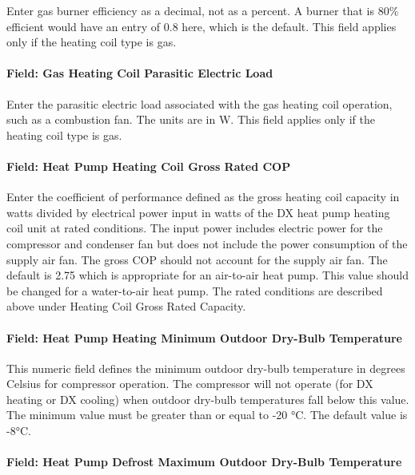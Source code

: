 Enter gas burner efficiency as a decimal, not as a percent. A burner that is 80\% efficient would have an entry of 0.8 here, which is the default. This field applies only if the heating coil type is gas.

\paragraph{Field: Gas Heating Coil Parasitic Electric Load}\label{field-gas-heating-coil-parasitic-electric-load-2}

Enter the parasitic electric load associated with the gas heating coil operation, such as a combustion fan. The units are in W. This field applies only if the heating coil type is gas.

\paragraph{Field: Heat Pump Heating Coil Gross Rated COP}\label{field-heat-pump-heating-coil-gross-rated-cop-3}

Enter the coefficient of performance defined as the gross heating coil capacity in watts divided by electrical power input in watts of the DX heat pump heating coil unit at rated conditions. The input power includes electric power for the compressor and condenser fan but does not include the power consumption of the supply air fan. The gross COP should not account for the supply air fan. The default is 2.75 which is appropriate for an air-to-air heat pump. This value should be changed for a water-to-air heat pump. The rated conditions are described above under Heating Coil Gross Rated Capacity.

\paragraph{Field: Heat Pump Heating Minimum Outdoor Dry-Bulb Temperature}\label{field-heat-pump-heating-minimum-outdoor-dry-bulb-temperature-2}

This numeric field defines the minimum outdoor dry-bulb temperature in degrees Celsius for compressor operation. The compressor will not operate (for DX heating or DX cooling) when outdoor dry-bulb temperatures fall below this value. The minimum value must be greater than or equal to -20 °C. The default value is -8°C.

\paragraph{Field: Heat Pump Defrost Maximum Outdoor Dry-Bulb Temperature}\label{field-heat-pump-defrost-maximum-outdoor-dry-bulb-temperature-2}


